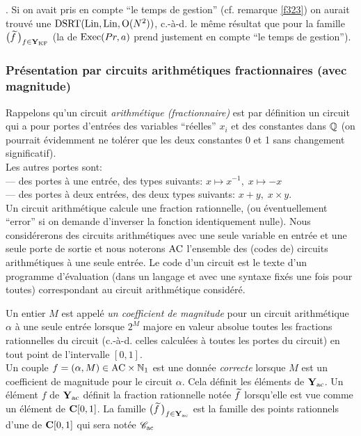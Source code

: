 \medskip {}. Si on avait pris en compte ``le temps de gestion'' (cf. remarque \ref{f323}) on aurait trouvé une \com  ${\rm DSRT}({\rm Lin}, {\rm Lin}, {\rm O}(N^2))$, c.-à-d. le même résultat que pour la famille  $\big(\widetilde{f}\,\big)_{f \in {{\bf Y}_{\rm KF}}}$  (la \com de  ${\rm Exec}(Pr,a)$  prend justement en compte ``le temps de gestion'').

\subsubsection{Présentation par circuits arithmétiques fractionnaires (avec magnitude)}\label{fsubsubsec 413}
Rappelons qu'un circuit {\em arithmétique (fractionnaire)} est par 
définition un circuit qui a pour portes d'entrées des variables ``réelles''  $x_i$  et des constantes dans $\mathbb {Q}$  (on pourrait évidemment ne tolérer que 
les deux constantes  0  et  1  sans changement significatif). \\
Les autres portes sont:\\
--- des portes à une entrée, des types suivants:  
$x \mapsto x^{-1}, \; x \mapsto -x$ \\
--- des portes à deux entrées, des deux types suivants:  
$x+y, \; x \times y$. \\ 
Un circuit arithmétique calcule une fraction rationnelle, (ou éventuellement 
``error'' si on demande d'inverser la fonction identiquement nulle).
Nous considérerons des circuits arithmétiques avec une seule variable en 
entrée et une seule porte de sortie et nous noterons  ${\rm AC}$  l'ensemble des 
(codes de) circuits arithmétiques à une seule entrée.  Le code d'un 
circuit est le texte d'un programme d'évaluation (dans un langage et avec une 
syntaxe fixés une fois pour toutes) correspondant au circuit arithmétique 
considéré.


\begin{fdefinition} \label{f4110}
Un entier  $M$  est appelé {\em un coefficient de magnitude} pour un circuit 
arithmétique $\alpha$ à une seule entrée lorsque $2^M$  majore en valeur 
absolue toutes les fractions rationnelles du circuit (c.-à-d. celles 
calculées à toutes les portes du circuit) en tout point de l'intervalle 
$[0,1]$. \\
Un couple  $f = (\alpha, M) \in {\rm AC} \times \mathbb {N}_1$ est une donnée {\em 
correcte} lorsque $M$ est un coefficient de magnitude pour le circuit  $\alpha$.  
Cela définit les éléments de  ${{\bf Y}_{\rm ac}}$.  Un élément $f$ de  ${{\bf Y}_{\rm ac}}$  
définit la fraction rationnelle notée  $\widetilde{f}$    lorsqu'elle est 
vue comme un élément de  ${{\bf C}[0,1]}$.  
La famille  $\big(\widetilde{f}\,\big)_{f \in {{\bf Y}_{\rm ac}} }$ est la famille des points rationnels 
d'une \pres de  ${{\bf C}[0,1]}$  qui sera notée  ${{{\mathscr C}}_{\rm ac}}$
\end{fdefinition}
 

